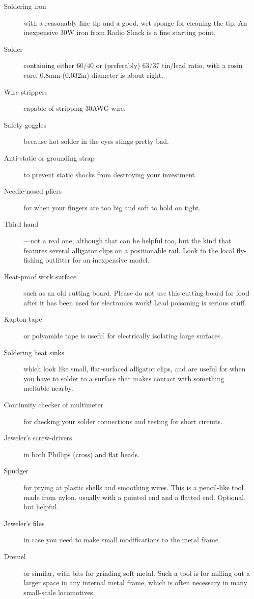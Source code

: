 \documentclass[12pt,letterpaper,draft]{memoir} %
\begin{document}
\begin{description}
\item[Soldering iron] with a reasonably fine tip and a good, wet sponge for cleaning the tip. An inexpensive 30W iron from Radio Shack is a fine starting point.
\item[Solder] containing either 60/40 or (preferably) 63/37 tin/lead ratio, with a rosin core. 0.8mm (0.032in) diameter is about right.
\item[Wire strippers] capable of stripping 30AWG wire.
\item[Safety goggles] because hot solder in the eyes stings pretty bad.
\item[Anti-static or grounding strap] to prevent static shocks from destroying your investment.
\item[Needle-nosed pliers] for when your fingers are too big and soft to hold on tight.
\item[Third hand]---not a real one, although that can be helpful too, but the kind that features several alligator clips on a positionable rail. Look to the local fly-fishing outfitter for an inexpensive model.
\item[Heat-proof work surface] such as an old cutting board. Please do not use this cutting board for food after it has been used for electronics work! Lead poisoning is serious stuff.
\item[Kapton tape] or polyamide tape is useful for electrically isolating large surfaces.
\item[Soldering heat sinks] which look like small, flat-surfaced alligator clips, and are useful for when you have to solder to a surface that makes contact with something meltable nearby.
\item[Continuity checker of multimeter] for checking your solder connections and testing for short circuits.
\item[Jeweler's screw-drivers] in both Phillips (cross) and flat heads.
\item[Spudger] for prying at plastic shells and smoothing wires. This is a pencil-like tool made from nylon, usually with a pointed end and a flatted end. Optional, but helpful.
\item[Jeweler's files] in case you need to make small modifications to the metal frame.
\item[Dremel] or similar, with bits for grinding soft metal. Such a tool is for milling out a larger space in any internal metal frame, which is often necessary in many small-scale locomotives.
\end{description}
\end{document}

